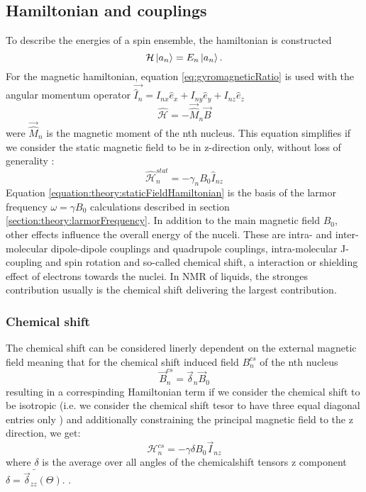         \subsection{Hamiltonian and couplings}
            To describe the energies of a spin ensemble, the hamiltonian is constructed
            \begin{equation*}
                \mathcal{H}\ket{a_n} = E_n \ket{a_n}.
            \end{equation*}
            For the magnetic hamiltonian, equation \ref{eq:gyromagneticRatio} is used with the angular momentum operator $\vec{\hat I_n} = I_{nx}\hat{e}_x + I_{ny}\hat{e}_y + I_{nz} \hat{e}_z$
            \begin{equation}
                \mathcal{\hat H} = - \vec{\hat M}_n \vec B
            \end{equation}
            were $\vec{\hat M}_n $ is the magnetic moment of the nth nucleus. This equation simplifies if we consider the static magnetic field to be in z-direction only, without loss of generality \cite{ashok_lectures_2013}:
            \begin{equation}
                \label{equation:theory:staticFieldHamiltonian}
                \mathcal{\hat H}_n^{stat} = - \gamma_n B_0 \hat{I}_{nz}
            \end{equation}
            Equation \ref{equation:theory:staticFieldHamiltonian} is the basis of the larmor frequency $\omega = \gamma B_0$ calculations described in section \ref{section:theory:larmorFrequency}.
            In addition to the main magnetic field $B_0$, other effects influence the overall energy of the nuceli. These are intra- and inter-molecular dipole-dipole couplings and quadrupole couplings, intra-molecular J-coupling and spin rotation and so-called chemical shift, a interaction or shielding effect of electrons towards the nuclei.
            In NMR of liquids, the stronges contribution usually is the chemical shift delivering the largest contribution. 
        \subsubsection{Chemical shift}
            The chemical shift can be considered linerly dependent on the external magnetic field meaning that for the chemical shift induced field $B_n^{cs}$ of the nth nucleus
            \begin{equation}
                \vec B_n^{cs} = \vec{\delta}_n\vec B_0
            \end{equation}
            resulting in a correspinding Hamiltonian term if we consider the chemical shift to be isotropic (i.e. we consider the chemical shift tesor to have three equal diagonal entries only \cite{levitt_spin_nodate} ) and additionally constraining the principal magnetic field to the z direction, we get:
            \begin{equation}
                \mathcal H_n^{cs} = -\gamma \delta B_0 \vec I_{nz}
            \end{equation}
            where $\delta$ is the average over all angles of the chemicalshift tensors z component $\bar{\delta = \vec{ \delta}_{zz}(\Theta)}$.  \cite{abraham_proton_1997}.
